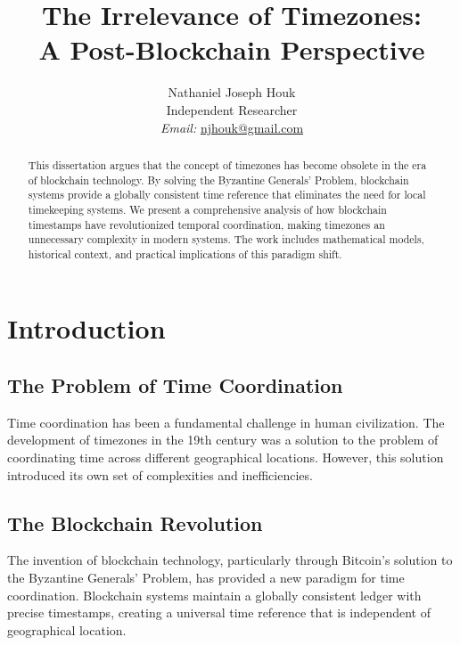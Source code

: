 \documentclass[12pt]{report}
\begin{document}
\title{The Irrelevance of Timezones: \\ A Post-Blockchain Perspective}

\author{Nathaniel Joseph Houk\\
Independent Researcher\\
\textit{Email:} \href{mailto:njhouk@gmail.com}{njhouk@gmail.com}}

\maketitle

\begin{abstract}
This dissertation argues that the concept of timezones has become obsolete in the era of blockchain technology. By solving the Byzantine Generals' Problem, blockchain systems provide a globally consistent time reference that eliminates the need for local timekeeping systems. We present a comprehensive analysis of how blockchain timestamps have revolutionized temporal coordination, making timezones an unnecessary complexity in modern systems. The work includes mathematical models, historical context, and practical implications of this paradigm shift.
\end{abstract}

\chapter{Introduction}

\section{The Problem of Time Coordination}
Time coordination has been a fundamental challenge in human civilization. The development of timezones in the 19th century was a solution to the problem of coordinating time across different geographical locations. However, this solution introduced its own set of complexities and inefficiencies.

\section{The Blockchain Revolution}
The invention of blockchain technology, particularly through Bitcoin's solution to the Byzantine Generals' Problem, has provided a new paradigm for time coordination. Blockchain systems maintain a globally consistent ledger with precise timestamps, creating a universal time reference that is independent of geographical location.
\end{document}
